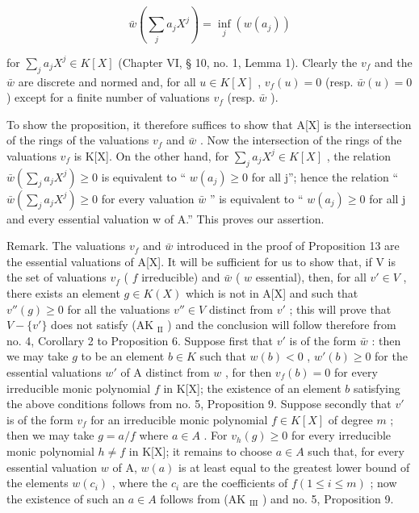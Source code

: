 \[
\bar {w} \left(\sum_ {j} a _ {j} X ^ {j}\right) = \inf _ {j} (w (a _ {j}))
\]

for \(\sum_{j} a_j X^j \in K[X]\) (Chapter VI, § 10, no. 1, Lemma 1). Clearly the \(v_f\) and the \(\bar{w}\) are discrete and normed and, for all \(u \in K[X]\) , \(v_f(u) = 0\) (resp. \(\bar{w}(u) = 0\) ) except for a finite number of valuations \(v_f\) (resp. \(\bar{w}\) ).

To show the proposition, it therefore suffices to show that A{[}X{]} is the intersection of the rings of the valuations \(v_{f}\) and \(\bar{w}\) . Now the intersection of the rings of the valuations \(v_{f}\) is K{[}X{]}. On the other hand, for \(\sum_{j} a_{j} X^{j} \in K[X]\) , the relation \(\bar{w}\left(\sum_{j} a_{j} X^{j}\right) \geqslant 0\) is equivalent to `` \(w(a_{j}) \geqslant 0\) for all j''; hence the relation `` \(\bar{w}\left(\sum_{j} a_{j} X^{j}\right) \geqslant 0\) for every valuation \(\bar{w}\) '' is equivalent to `` \(w(a_{j}) \geqslant 0\) for all j and every essential valuation w of A.'' This proves our assertion.

Remark. The valuations \(v_f\) and \(\bar{w}\) introduced in the proof of Proposition 13 are the essential valuations of A{[}X{]}. It will be sufficient for us to show that, if V is the set of valuations \(v_f\) ( \(f\) irreducible) and \(\bar{w}\) ( \(w\) essential), then, for all \(v' \in V\) , there exists an element \(g \in K(X)\) which is not in A{[}X{]} and such that \(v''(g) \geqslant 0\) for all the valuations \(v'' \in V\) distinct from \(v'\) ; this will prove that \(V - \{v'\}\) does not satisfy (AK \(_{\text{II}}\) ) and the conclusion will follow therefore from no. 4, Corollary 2 to Proposition 6. Suppose first that \(v'\) is of the form \(\bar{w}\) : then we may take \(g\) to be an element \(b \in K\) such that \(w(b) < 0\) , \(w'(b) \geqslant 0\) for the essential valuations \(w'\) of A distinct from \(w\) , for then \(v_f(b) = 0\) for every irreducible monic polynomial \(f\) in K{[}X{]}; the existence of an element \(b\) satisfying the above conditions follows from no. 5, Proposition 9. Suppose secondly that \(v'\) is of the form \(v_f\) for an irreducible monic polynomial \(f \in K[X]\) of degree \(m\) ; then we may take \(g = a/f\) where \(a \in A\) . For \(v_h(g) \geqslant 0\) for every irreducible monic polynomial \(h \neq f\) in K{[}X{]}; it remains to choose \(a \in A\) such that, for every essential valuation \(w\) of A, \(w(a)\) is at least equal to the greatest lower bound of the elements \(w(c_i)\) , where the \(c_i\) are the coefficients of \(f (1 \leqslant i \leqslant m)\) ; now the existence of such an \(a \in A\) follows from (AK \(_{\text{III}}\) ) and no. 5, Proposition 9.

